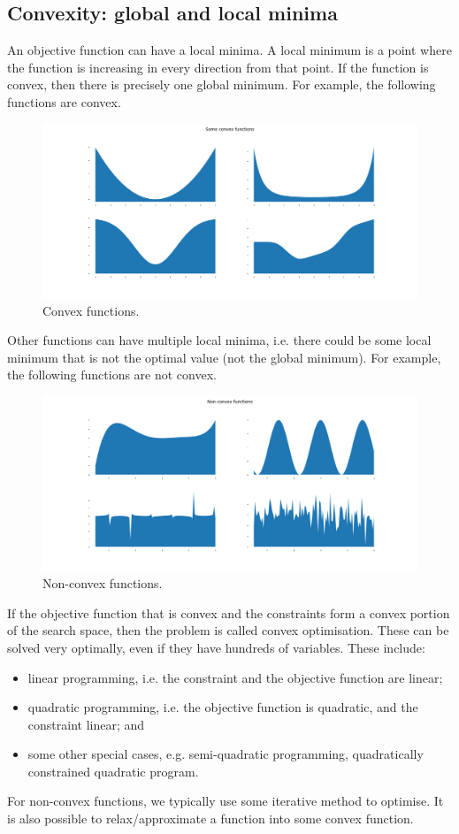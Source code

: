 \documentclass[a4paper, openany]{memoir}
\begin{document}
\subsection{Convexity: global and local minima}
An objective function can have a local minima. A local minimum is a point where the function is increasing in every direction from that point. If the function is convex, then there is precisely one global minimum. For example, the following functions are convex.
\begin{figure}[H]
    \centering
    \includegraphics[scale=0.315]{src/4.7 convex functions.png}
    \caption{Convex functions.}
\end{figure}
\noindent Other functions can have multiple local minima, i.e. there could be some local minimum that is not the optimal value (not the global minimum). For example, the following functions are not convex.
\begin{figure}[H]
    \centering
    \includegraphics[scale=0.315]{src/4.8 nonconvex functions.png}
    \caption{Non-convex functions.}
\end{figure}

If the objective function that is convex and the constraints form a convex portion of the search space, then the problem is called convex optimisation. These can be solved very optimally, even if they have hundreds of variables. These include:
\begin{itemize}
    \item linear programming, i.e. the constraint and the objective function are linear;
    \item quadratic programming, i.e. the objective function is quadratic, and the constraint linear; and
    \item some other special cases, e.g. semi-quadratic programming, quadratically constrained quadratic program.
\end{itemize}
For non-convex functions, we typically use some iterative method to optimise. It is also possible to relax/approximate a function into some convex function.
\end{document}
